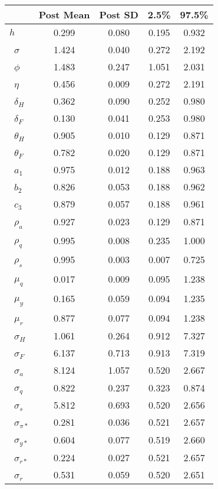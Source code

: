 \begin{tiny}\begin{tabular}{lcccc}
\hline
&\textbf{Post Mean}&\textbf{Post SD}&\textbf{2.5\%}&\textbf{97.5\%}\\\hline
\textbf{$ h             $}&0.299&0.080&0.195&0.932\\\
\textbf{$ \sigma        $}&1.424&0.040&0.272&2.192\\\
\textbf{$ \phi          $}&1.483&0.247&1.051&2.031\\\
\textbf{$ \eta          $}&0.456&0.009&0.272&2.191\\\
\textbf{$ \delta_{H}    $}&0.362&0.090&0.252&0.980\\\
\textbf{$ \delta_{F}    $}&0.130&0.041&0.253&0.980\\\
\textbf{$ \theta_{H}    $}&0.905&0.010&0.129&0.871\\\
\textbf{$ \theta_{F}    $}&0.782&0.020&0.129&0.871\\\
\textbf{$ a_{1}         $}&0.975&0.012&0.188&0.963\\\
\textbf{$ b_{2}         $}&0.826&0.053&0.188&0.962\\\
\textbf{$ c_{3}         $}&0.879&0.057&0.188&0.961\\\
\textbf{$ \rho_{a}      $}&0.927&0.023&0.129&0.871\\\
\textbf{$ \rho_{q}      $}&0.995&0.008&0.235&1.000\\\
\textbf{$ \rho_{s}      $}&0.995&0.003&0.007&0.725\\\
\textbf{$ \mu_{q}       $}&0.017&0.009&0.095&1.238\\\
\textbf{$ \mu_{y}       $}&0.165&0.059&0.094&1.235\\\
\textbf{$ \mu_{r}       $}&0.877&0.077&0.094&1.238\\\
\textbf{$ \sigma_{H}    $}&1.061&0.264&0.912&7.327\\\
\textbf{$ \sigma_{F}    $}&6.137&0.713&0.913&7.319\\\
\textbf{$ \sigma_{a}    $}&8.124&1.057&0.520&2.667\\\
\textbf{$ \sigma_{q}    $}&0.822&0.237&0.323&0.874\\\
\textbf{$ \sigma_{s}    $}&5.812&0.693&0.520&2.656\\\
\textbf{$ \sigma_{\pi*} $}&0.281&0.036&0.521&2.657\\\
\textbf{$ \sigma_{y*}   $}&0.604&0.077&0.519&2.660\\\
\textbf{$ \sigma_{r*}   $}&0.224&0.027&0.521&2.657\\\
\textbf{$ \sigma_{r}    $}&0.531&0.059&0.520&2.651\\\hline
\end{tabular}
\end{tiny}